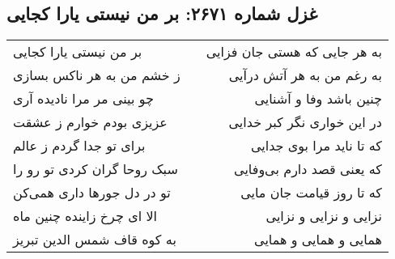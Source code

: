\begin{center}
\section*{غزل شماره ۲۶۷۱: بر من نیستی یارا کجایی}
\label{sec:2671}
\begin{longtable}{l p{0.5cm} r}
بر من نیستی یارا کجایی
&&
به هر جایی که هستی جان فزایی
\\
ز خشم من به هر ناکس بسازی
&&
به رغم من به هر آتش درآیی
\\
چو بینی مر مرا نادیده آری
&&
چنین باشد وفا و آشنایی
\\
عزیزی بودم خوارم ز عشقت
&&
در این خواری نگر کبر خدایی
\\
برای تو جدا گردم ز عالم
&&
که تا ناید مرا بوی جدایی
\\
سبک روحا گران کردی تو رو را
&&
که یعنی قصد دارم بی‌وفایی
\\
تو در دل جورها داری همی‌کن
&&
که تا روز قیامت جان مایی
\\
الا ای چرخ زاینده چنین ماه
&&
نزایی و نزایی و نزایی
\\
به کوه قاف شمس الدین تبریز
&&
همایی و همایی و همایی
\\
\end{longtable}
\end{center}
